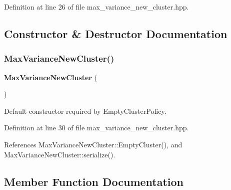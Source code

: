 Definition at line 26 of file max\+\_\+variance\+\_\+new\+\_\+cluster.\+hpp.



\subsection{Constructor \& Destructor Documentation}
\mbox{\label{classmlpack_1_1kmeans_1_1MaxVarianceNewCluster_a9ed3717eabbef469bb2e7a2db8a95ab8}} 
\subsubsection{Max\+Variance\+New\+Cluster()}
{\footnotesize\ttfamily \textbf{ Max\+Variance\+New\+Cluster} (\begin{DoxyParamCaption}{ }\end{DoxyParamCaption})\hspace{0.3cm}{\ttfamily [inline]}}



Default constructor required by Empty\+Cluster\+Policy. 



Definition at line 30 of file max\+\_\+variance\+\_\+new\+\_\+cluster.\+hpp.



References Max\+Variance\+New\+Cluster\+::\+Empty\+Cluster(), and Max\+Variance\+New\+Cluster\+::serialize().



\subsection{Member Function Documentation}
\mbox{\label{classmlpack_1_1kmeans_1_1MaxVarianceNewCluster_a19c2bf320368cb77a6e5cb604b35b42d}} 
